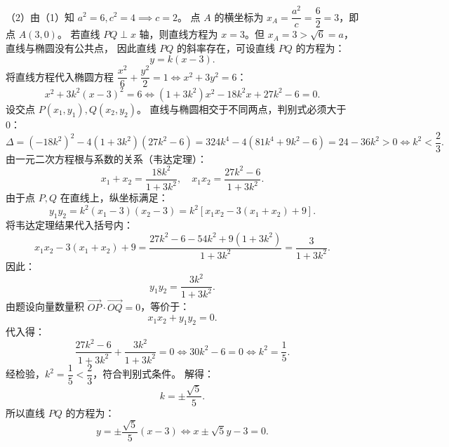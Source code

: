 \begin{answer}
（2）由（1）知 $a^2 = 6, c^2 = 4 \implies c = 2$。
点 $A$ 的横坐标为 $x_A = \dfrac{a^2}{c} = \dfrac{6}{2} = 3$，即点 $A(3, 0)$。
若直线 $PQ \perp x$ 轴，则直线方程为 $x = 3$。但 $x_A = 3 > \sqrt{6} = a$，直线与椭圆没有公共点，
因此直线 $PQ$ 的斜率存在，可设直线 $PQ$ 的方程为：
\nopagebreak[4]
\[
y = k(x - 3).
\]
将直线方程代入椭圆方程 $\dfrac{x^2}{6} + \dfrac{y^2}{2} = 1 \iff x^2 + 3y^2 = 6$：
\nopagebreak[4]
\[
x^2 + 3k^2(x - 3)^2 = 6 \iff (1 + 3k^2)x^2 - 18k^2 x + 27k^2 - 6 = 0.
\]
设交点 $P(x_1, y_1), Q(x_2, y_2)$。
直线与椭圆相交于不同两点，判别式必须大于 0：
\nopagebreak[4]
\[
\Delta = (-18k^2)^2 - 4(1 + 3k^2)(27k^2 - 6) = 324k^4 - 4(81k^4 + 9k^2 - 6) = 24 - 36k^2 > 0 \iff k^2 < \dfrac{2}{3}.
\]
由一元二次方程根与系数的关系（韦达定理）：
\nopagebreak[4]
\[
x_1 + x_2 = \dfrac{18k^2}{1 + 3k^2}, \quad x_1 x_2 = \dfrac{27k^2 - 6}{1 + 3k^2}.
\]
由于点 $P, Q$ 在直线上，纵坐标满足：
\nopagebreak[4]
\[
y_1 y_2 = k^2(x_1 - 3)(x_2 - 3) = k^2[x_1 x_2 - 3(x_1 + x_2) + 9].
\]
将韦达定理结果代入括号内：
\nopagebreak[4]
\[
x_1 x_2 - 3(x_1 + x_2) + 9 = \dfrac{27k^2 - 6 - 54k^2 + 9(1 + 3k^2)}{1 + 3k^2} = \dfrac{3}{1 + 3k^2}.
\]
因此：
\nopagebreak[4]
\[
y_1 y_2 = \dfrac{3k^2}{1 + 3k^2}.
\]
由题设向量数量积 $\vec{OP} \cdot \vec{OQ} = 0$，等价于：
\nopagebreak[4]
\[
x_1 x_2 + y_1 y_2 = 0.
\]
代入得：
\nopagebreak[4]
\[
\dfrac{27k^2 - 6}{1 + 3k^2} + \dfrac{3k^2}{1 + 3k^2} = 0 \iff 30k^2 - 6 = 0 \iff k^2 = \dfrac{1}{5}.
\]
经检验，$k^2 = \dfrac{1}{5} < \dfrac{2}{3}$，符合判别式条件。
解得：
\nopagebreak[4]
\[
k = \pm \dfrac{\sqrt{5}}{5}.
\]
所以直线 $PQ$ 的方程为：
\nopagebreak[4]
\[
y = \pm \dfrac{\sqrt{5}}{5}(x - 3) \iff x \pm \sqrt{5}y - 3 = 0.
\]


\end{answer}